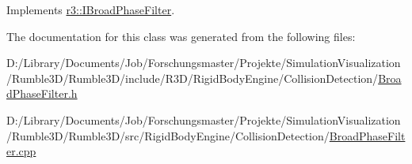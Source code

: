 Implements \mbox{\hyperlink{classr3_1_1_i_broad_phase_filter_a19bfa977243bcdd0ec143a0aca750649}{r3\+::\+I\+Broad\+Phase\+Filter}}.



The documentation for this class was generated from the following files\+:\begin{DoxyCompactItemize}
\item 
D\+:/\+Library/\+Documents/\+Job/\+Forschungsmaster/\+Projekte/\+Simulation\+Visualization/\+Rumble3\+D/\+Rumble3\+D/include/\+R3\+D/\+Rigid\+Body\+Engine/\+Collision\+Detection/\mbox{\hyperlink{_broad_phase_filter_8h}{Broad\+Phase\+Filter.\+h}}\item 
D\+:/\+Library/\+Documents/\+Job/\+Forschungsmaster/\+Projekte/\+Simulation\+Visualization/\+Rumble3\+D/\+Rumble3\+D/src/\+Rigid\+Body\+Engine/\+Collision\+Detection/\mbox{\hyperlink{_broad_phase_filter_8cpp}{Broad\+Phase\+Filter.\+cpp}}\end{DoxyCompactItemize}
